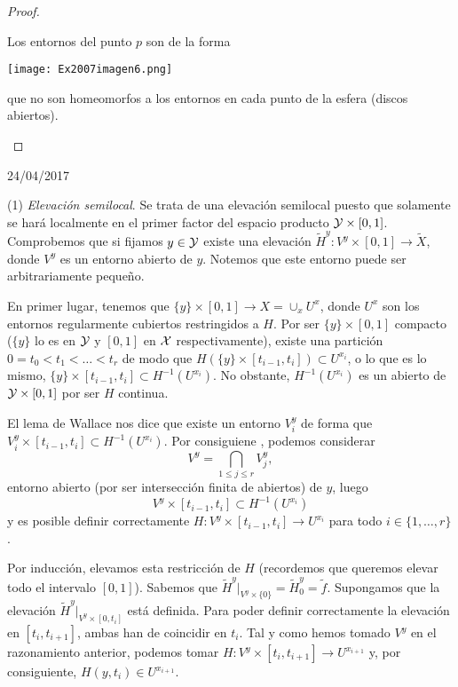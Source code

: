\begin{itemize}
\begin{proof}
\begin{enumerate}
	Los entornos del punto $p$ son de la forma
	
		\begin{center}
			\texttt{[image: Ex2007imagen6.png]} 
		\end{center}
		
que no son homeomorfos a los entornos en cada punto de la esfera (discos abiertos). 
	\end{enumerate}	
\end{proof}

24/04/2017

(1) \emph{Elevación semilocal}. Se trata de una elevación semilocal puesto que solamente se hará localmente en el primer factor del espacio producto $\mathcal{Y}\times [0,1]$. Comprobemos que si fijamos $y\in \mathcal{Y}$ existe una elevación $\tilde{H}^y: V^y\times [0,1]\to \tilde{X}$, donde $V^y$ es un entorno abierto de $y$. Notemos que este entorno puede ser arbitrariamente pequeño. 

En primer lugar, tenemos que $\{y\}\times [0,1]\to X=\cup_x U^x$, donde $U^x$ son los entornos regularmente cubiertos restringidos a $H$. Por ser $\{y\}\times[0,1]$ compacto ($\{y\}$ lo es en $\mathcal{Y}$ y $[0,1]$ en $\mathcal{X}$ respectivamente), existe una partición $0=t_0<t_1<\ldots <t_r$ de modo que $H(\{y\}\times [t_{i-1},t_i])\subset U^{x_i}$, o lo que es lo mismo, $\{y\}\times [t_{i-1},t_i]\subset H^{-1}(U^{x_i})$. No obstante, $H^{-1}(U^{x_i})$ es un abierto de $\mathcal{Y}\times[0,1]$ por ser $H$ continua. 

El lema de Wallace nos dice que existe un entorno $V^y_i$ de forma que $V_i^y\times [t_{i-1},t_i]\subset H^{-1}(U^{x_i})$. Por consiguiene , podemos considerar
\[V^y=\bigcap_{1\leq j\leq r}V_j^y,\]
entorno abierto  (por ser intersección finita de abiertos) de $y$, luego 
\[V^y\times[t_{i-1},t_i]\subset H^{-1}(U^{x_i})\]
y es posible definir correctamente $H: V^y\times [t_{i-1},t_i]\to U^{x_i}$ para todo $i\in\{1,\ldots, r\}$. 

Por inducción, elevamos esta restricción de $H$ (recordemos que queremos elevar todo el intervalo $[0,1]$). Sabemos que $\tilde{H}^y |_{V^y\times \{0\}}=\tilde{H}_0^y=\tilde{f}$. Supongamos que la elevación $\tilde{H}^y |_{V^y\times [0,t_i]}$ está definida. Para poder definir correctamente la elevación en $[t_i,t_{i+1}]$, ambas han de coincidir en $t_i$. Tal y como hemos tomado $V^y$ en el razonamiento anterior, podemos tomar $H:V^y\times[t_i,t_{i+1}]\to U^{x_{i+1}}$ y, por consiguiente, $H(y,t_i)\in U^{x_{i+1}}$. 


\end{itemize}
